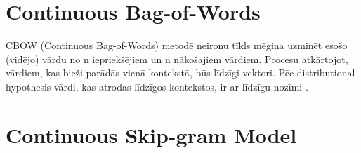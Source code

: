\section{Continuous Bag-of-Words}

CBOW (Continuous Bag-of-Words) metodē neironu tīkls mēģina uzminēt esošo (vidējo) vārdu no n iepriekšējiem un n nākošajiem vārdiem. Procesu atkārtojot, vārdiem, kas bieži parādās vienā kontekstā, būs līdzīgi vektori. Pēc distributional hypothesis vārdi, kas atrodas līdzīgos kontekstos, ir ar līdzīgu nozīmi \cite{word2vec2013}.


\section{Continuous Skip-gram Model}